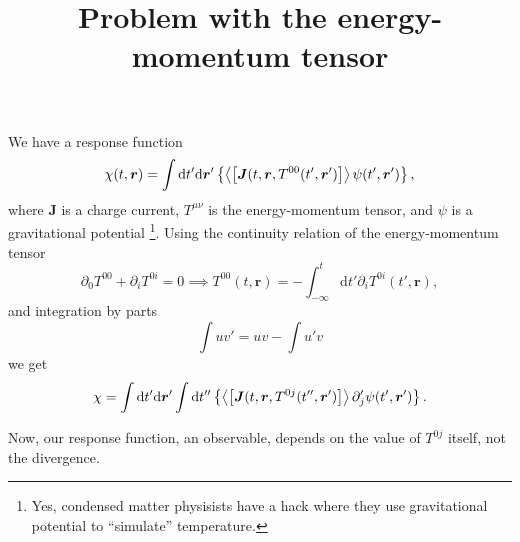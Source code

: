\documentclass{article}
\title{Problem with the energy-momentum tensor}
\date\empty
\renewcommand\vec\bm
\begin{document}
\maketitle
\vspace{-1cm}
We have a response function
\begin{equation}
  \label{eq:1}
  \chi(t, \vec{r}) = \int \mathrm{d}t' \mathrm{d} \vec{r}'
  \left\{
  \Braket{\left[\vec{J}(t, \vec{r}, T^{00}(t', \vec{r}')\right] } \psi(t', \vec{r}')
\right\},
\end{equation}
where \( \vec{J} \) is a charge current, \( T^{\mu\nu} \) is the energy-momentum tensor, and \( \psi \) is a gravitational potential \footnote{Yes, condensed matter physisists have a hack where they use gravitational potential to ``simulate'' temperature.}.
Using the continuity relation of the energy-momentum tensor
\[
\partial_0 T^{00} + \partial_i T^{0i} = 0 \implies T^{00}(t, \vec{r}) = -\int_{-\infty}^t \mathrm{d}t' \partial_iT^{0i}(t', \vec{r}),
\]
and integration by parts
\[
\int u v' = uv - \int u' v
\]
we get
\begin{equation}
  \chi = \int \mathrm{d}t' \mathrm{d} \vec{r}'
  \int \mathrm{d}t''
  \left\{
  \Braket{\left[\vec{J}(t, \vec{r}, T^{0j}(t'', \vec{r}')\right] } \partial_j'\psi(t', \vec{r}')
\right\}.
\end{equation}

Now, our response function, an observable, depends on the value of \( T^{0j} \) itself, not the divergence.
\end{document}
